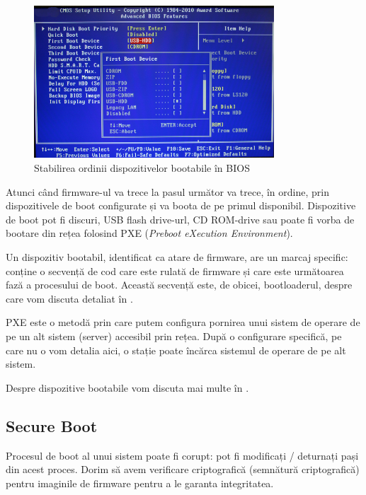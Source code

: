 \begin{figure}[!htbp]
  \centering
  \includegraphics[width=0.8\textwidth]{chapters/09-boot/img/bios-boot-order.png}
  \caption{Stabilirea ordinii dispozitivelor bootabile în BIOS}
  \label{fig:boot:bios-boot-order}
\end{figure}

Atunci când firmware-ul va trece la pasul următor va trece, în ordine, prin
dispozitivele de boot configurate și va boota de pe primul disponibil.
Dispozitive de boot pot fi discuri, USB flash drive-url, CD ROM-drive sau poate fi vorba de
bootare din rețea folosind PXE 
(\textit{Preboot eXecution Environment}).

Un dispozitiv bootabil, identificat
ca atare de firmware, are un marcaj specific: conține o secvență de cod care este rulată de firmware și
care este următoarea fază a procesului de boot. Această secvență este, de
obicei, bootloaderul, despre care vom discuta detaliat în
.

PXE este o metodă prin care putem configura pornirea unui sistem de operare de
pe un alt sistem (server) accesibil prin rețea. După o configurare specifică, pe
care nu o vom detalia aici, o stație poate încărca sistemul de operare de pe
alt sistem.

Despre dispozitive bootabile vom discuta mai multe în
.

\subsection{Secure Boot}
\label{sec:boot:secure-boot}

Procesul de boot al unui sistem poate fi corupt: pot fi modificați / deturnați
pași din acest proces. Dorim să avem verificare criptografică (semnătură
criptografică) pentru imaginile de firmware pentru a le garanta integritatea.

